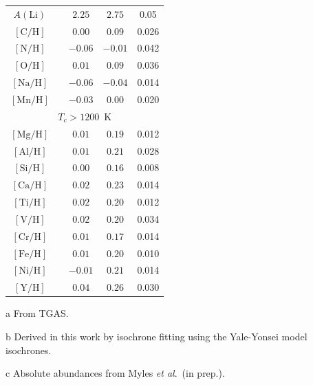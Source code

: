 \documentclass[12pt,letterpaper,margin=1in]{article}
\newcommand{\acronym}[1]{{\small{#1}}}
\newcommand{\tgas}{\acronym{TGAS}}
\newcommand{\etal}{\textit{et al}.}
\newcommand*\elem[1]{\ensuremath{\mathrm{#1}}}
\newcommand*\elemH[1]{\ensuremath{[\mathrm{#1}/\elem{H}]}}
\begin{document}
\begin{table}[htpb]
\begin{threeparttable}
\begin{tabular}{ccccc}
\hline
$A(\elem{Li})$\tnote{c} &                & $2.25$                 & $2.75$                 & 0.05          \\
$\elemH{C}$             &                & $0.00$                 & $0.09$                 & 0.026         \\
$\elemH{N}$             &                & $-0.06$                & $-0.01$                & 0.042         \\
$\elemH{O}$             &                & $0.01$                 & $0.09$                 & 0.036         \\
$\elemH{Na}$            &                & $-0.06$                & $-0.04$                & 0.014         \\
$\elemH{Mn}$            &                & $-0.03$                & $0.00$                 & 0.020         \\
\hline
\multicolumn{5}{c}{$T_c > 1200$~K} \\
\hline
$\elemH{Mg}$            &                & $0.01$                 & $0.19$                 & 0.012         \\
$\elemH{Al}$            &                & $0.01$                 & $0.21$                 & 0.028         \\
$\elemH{Si}$            &                & $0.00$                 & $0.16$                 & 0.008         \\
$\elemH{Ca}$            &                & $0.02$                 & $0.23$                 & 0.014         \\
$\elemH{Ti}$            &                & $0.02$                 & $0.20$                 & 0.012         \\
$\elemH{V}$             &                & $0.02$                 & $0.20$                 & 0.034         \\
$\elemH{Cr}$            &                & $0.01$                 & $0.17$                 & 0.014         \\
$\elemH{Fe}$            &                & $0.01$                 & $0.20$                 & 0.010         \\
$\elemH{Ni}$            &                & $-0.01$                & $0.21$                 & 0.014         \\
$\elemH{Y}$             &                & $0.04$                 & $0.26$                 & 0.030         \\
\hline
\end{tabular}
\begin{tablenotes}
\item [a] From \tgas.
\item [b] Derived in this work by isochrone fitting using the Yale-Yonsei model
  isochrones\cite{2013ApJ...776...87S}.
\item [c] Absolute abundances from Myles \etal\ (in prep.).
\end{tablenotes}
\end{threeparttable}
\end{table}
\end{document}
